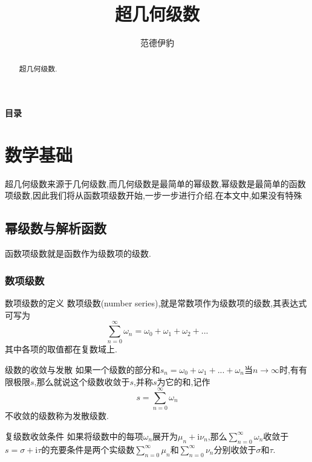 \documentclass[zihao=-4,a4paper]{ctexart}
\title{超几何级数}
\author[$\dagger$]{\kaishu 范德伊豹}
\affil[$\dagger$]{\kaishu 上海理工大学物理系}
\begin{document}
\maketitle
\begin{abstract}
	超几何级数.
\end{abstract}
{\centering \Large\bfseries 目录 \par}
\tableofcontents


\section{数学基础}

超几何级数来源于几何级数,而几何级数是最简单的幂级数,幂级数是最简单的函数项级数,因此我们将从函数项级数开始,一步一步进行介绍.在本文中,如果没有特殊

\subsection{幂级数与解析函数}

函数项级数就是函数作为级数项的级数.

\subsubsection{数项级数}

\begin{mdefinition}{数项级数的定义}
	数项级数(number series),就是常数项作为级数项的级数,其表达式可写为
	\begin{equation}
		\sum^{\infty}_{n=0} {\omega}_{n} = {\omega}_{0} + {\omega}_{1} + {\omega}_{2} + ...
	\end{equation}
	其中各项的取值都在复数域上.
\end{mdefinition}

\begin{mdefinition}{级数的收敛与发散}
	如果一个级数的部分和${s}_{n} = {\omega}_{0} + {\omega}_{1} + ... + {\omega}_{n}$当$n {\to} {\infty}$时,有有限极限$s$,那么就说这个级数收敛于$s$,并称$s$为它的和,记作
	\begin{equation}
		s = \sum^{\infty}_{n=0} {\omega}_{n}
	\end{equation}
	不收敛的级数称为发散级数.
\end{mdefinition}

\begin{mtheorem}{复级数收敛条件}
	如果将级数中的每项${\omega}_{n}$展开为${\mu}_{n} + {\text{i}} {\nu}_{n}$,那么$\sum^{\infty}_{n=0} {\omega}_{n}$收敛于$s = {\sigma} + {\text{i}}{\tau}$的充要条件是两个实级数$\sum^{\infty}_{n=0} {\mu}_{n}$和$\sum^{\infty}_{n=0} {\nu}_{n}$分别收敛于${\sigma}$和${\tau}$.
\end{mtheorem}
\end{document}
